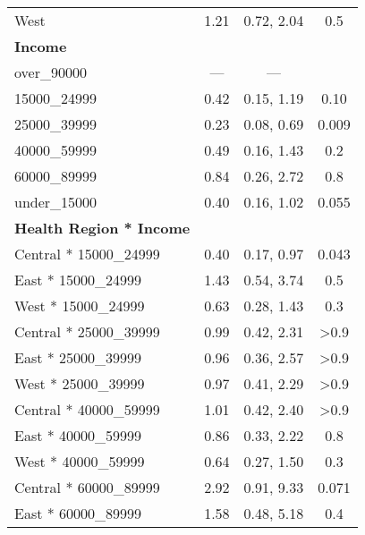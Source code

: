 \documentclass[
  letterpaper,
  DIV=11,
  numbers=noendperiod]{scrartcl}
\begin{document}
\begin{longtable}{lccc}
\hspace{1em}West & 1.21 & 0.72, 2.04 & 0.5\\
\textbf{Income} &  &  & \\
\hspace{1em}over\_90000 & — & — & \\
\hspace{1em}15000\_24999 & 0.42 & 0.15, 1.19 & 0.10\\
\addlinespace
\hspace{1em}25000\_39999 & 0.23 & 0.08, 0.69 & 0.009\\
\hspace{1em}40000\_59999 & 0.49 & 0.16, 1.43 & 0.2\\
\hspace{1em}60000\_89999 & 0.84 & 0.26, 2.72 & 0.8\\
\hspace{1em}under\_15000 & 0.40 & 0.16, 1.02 & 0.055\\
\textbf{Health Region * Income} &  &  & \\
\addlinespace
\hspace{1em}Central * 15000\_24999 & 0.40 & 0.17, 0.97 & 0.043\\
\hspace{1em}East * 15000\_24999 & 1.43 & 0.54, 3.74 & 0.5\\
\hspace{1em}West * 15000\_24999 & 0.63 & 0.28, 1.43 & 0.3\\
\hspace{1em}Central * 25000\_39999 & 0.99 & 0.42, 2.31 & >0.9\\
\hspace{1em}East * 25000\_39999 & 0.96 & 0.36, 2.57 & >0.9\\
\addlinespace
\hspace{1em}West * 25000\_39999 & 0.97 & 0.41, 2.29 & >0.9\\
\hspace{1em}Central * 40000\_59999 & 1.01 & 0.42, 2.40 & >0.9\\
\hspace{1em}East * 40000\_59999 & 0.86 & 0.33, 2.22 & 0.8\\
\hspace{1em}West * 40000\_59999 & 0.64 & 0.27, 1.50 & 0.3\\
\hspace{1em}Central * 60000\_89999 & 2.92 & 0.91, 9.33 & 0.071\\
\addlinespace
\hspace{1em}East * 60000\_89999 & 1.58 & 0.48, 5.18 & 0.4\\

\end{longtable}
\end{document}
